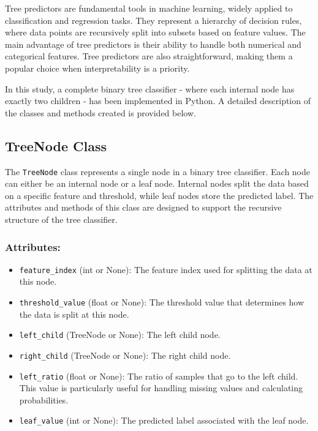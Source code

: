 \documentclass{article}
\begin{document}
Tree predictors are fundamental tools in machine learning, widely applied to classification and regression tasks. They represent a hierarchy of decision rules, where data points are recursively split into subsets based on feature values. The main advantage of tree predictors is their ability to handle both numerical and categorical features. Tree predictors are also straightforward, making them a popular choice when interpretability is a priority.

In this study, a complete binary tree classifier - where each internal node has exactly two children - has been implemented in Python. A detailed description of the classes and methods created is provided below.

\subsection{TreeNode Class}

The \texttt{TreeNode} class represents a single node in a binary tree classifier. Each node can either be an internal node or a leaf node. Internal nodes split the data based on a specific feature and threshold, while leaf nodes store the predicted label. The attributes and methods of this class are designed to support the recursive structure of the tree classifier.

\subsubsection*{Attributes:}
\begin{itemize}
    \item \texttt{feature\_index} (int or None): The feature index used for splitting the data at this node.
    \item \texttt{threshold\_value} (float or None): The threshold value that determines how the data is split at this node.
    \item \texttt{left\_child} (TreeNode or None): The left child node.
    \item \texttt{right\_child} (TreeNode or None): The right child node.
    \item \texttt{left\_ratio} (float or None): The ratio of samples that go to the left child. This value is particularly useful for handling missing values and calculating probabilities.
    \item \texttt{leaf\_value} (int or None): The predicted label associated with the leaf node.
\end{itemize}
\end{document}
